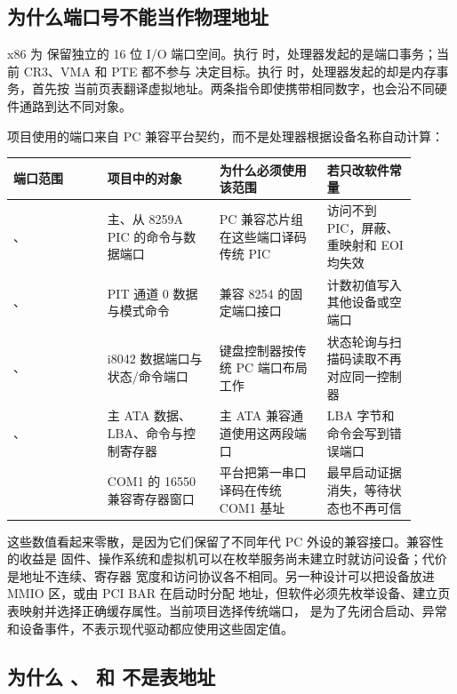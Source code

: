 \subsection{为什么端口号不能当作物理地址}

x86 为  保留独立的 16 位 I/O 端口空间。执行
 时，处理器发起的是端口事务；当前 CR3、VMA 和 PTE 都不参与
决定目标。执行  时，处理器发起的却是内存事务，首先按
当前页表翻译虚拟地址。两条指令即使携带相同数字，也会沿不同硬件通路到达不同对象。

项目使用的端口来自 PC 兼容平台契约，而不是处理器根据设备名称自动计算：

\begin{longtable}{|L{0.21\linewidth}|L{0.25\linewidth}|L{0.24\linewidth}|L{0.20\linewidth}|}
\hline
端口范围 & 项目中的对象 & 为什么必须使用该范围 & 若只改软件常量 \\ \hline
{}、 &
主、从 8259A PIC 的命令与数据端口 &
PC 兼容芯片组在这些端口译码传统 PIC &
访问不到 PIC，屏蔽、重映射和 EOI 均失效 \\\tablerowrule
{}、 &
PIT 通道 0 数据与模式命令 &
兼容 8254 的固定端口接口 &
计数初值写入其他设备或空端口 \\\tablerowrule
{}、 &
i8042 数据端口与状态/命令端口 &
键盘控制器按传统 PC 端口布局工作 &
状态轮询与扫描码读取不再对应同一控制器 \\\tablerowrule
{}、 &
主 ATA 数据、LBA、命令与控制寄存器 &
主 ATA 兼容通道使用这两段端口 &
LBA 字节和命令会写到错误端口 \\\tablerowrule
{} &
COM1 的 16550 兼容寄存器窗口 &
平台把第一串口译码在传统 COM1 基址 &
最早启动证据消失，等待状态也不再可信 \\ \hline
\end{longtable}

这些数值看起来零散，是因为它们保留了不同年代 PC 外设的兼容接口。兼容性的收益是
固件、操作系统和虚拟机可以在枚举服务尚未建立时就访问设备；代价是地址不连续、寄存器
宽度和访问协议各不相同。另一种设计可以把设备放进 MMIO 区，或由 PCI BAR 在启动时分配
地址，但软件必须先枚举设备、建立页表映射并选择正确缓存属性。当前项目选择传统端口，
是为了先闭合启动、异常和设备事件，不表示现代驱动都应使用这些固定值。

\subsection{为什么 、 和  不是表地址}

